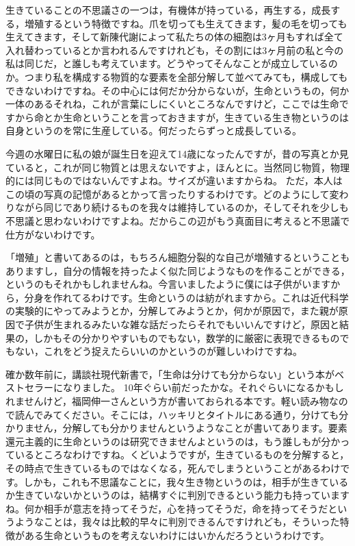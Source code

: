 \documentclass{ltjsbook}
\begin{document}
生きていることの不思議さの一つは，有機体が持っている，再生する，成長する，増殖するという特徴ですね。爪を切っても生えてきます，髪の毛を切っても生えてきます，そして新陳代謝によって私たちの体の細胞は3ヶ月もすれば全て入れ替わっているとか言われるんですけれども，その割には3ヶ月前の私と今の私は同じだ，と誰しも考えています。どうやってそんなことが成立しているのか。つまり私を構成する物質的な要素を全部分解して並べてみても，構成してもできないわけですね。その中心には何だか分からないが，生命というもの，何か一体のあるそれね，これが言葉にしにくいところなんですけど，ここでは生命ですから命とか生命ということを言っておきますが，生きている生き物というのは自身というのを常に生産している。何だったらずっと成長している。

今週の水曜日に私の娘が誕生日を迎えて14歳になったんですが，昔の写真とか見ていると，これが同じ物質とは思えないですよ，ほんとに。当然同じ物質，物理的には同じものではないんですよね。サイズが違いますからね。
ただ，本人はこの頃の写真の記憶があるとかって言ったりするわけです。どのようにして変わりながら同じであり続けるものを我々は維持しているのか，そしてそれを少しも不思議と思わないわけですよね。だからこの辺がもう真面目に考えると不思議で仕方がないわけです。

「増殖」と書いてあるのは，もちろん細胞分裂的な自己が増殖するということもありますし，自分の情報を持ったよく似た同じようなものを作ることができる，というのもそれかもしれませんね。今言いましたように僕には子供がいますから，分身を作れてるわけです。生命というのは紡がれますから。これは近代科学の実験的にやってみようとか，分解してみようとか，何かが原因で，また親が原因で子供が生まれるみたいな雑な話だったらそれでもいいんですけど，原因と結果の，しかもその分かりやすいものでもない，数学的に厳密に表現できるものでもない，これをどう捉えたらいいのかというのが難しいわけですね。

確か数年前に，講談社現代新書で，「生命は分けても分からない」という本がベストセラーになりました\parencite{FukuokaShin1}。
10年ぐらい前だったかな。それぐらいになるかもしれませんけど，福岡伸一さんという方が書いておられる本です。軽い読み物なので読んでみてください。そこには，ハッキリとタイトルにある通り，分けても分かりません，分解しても分かりませんというようなことが書いてあります。要素還元主義的に生命というのは研究できませんよというのは，もう誰しもが分かっているところなわけですね。くどいようですが，生きているものを分解すると，その時点で生きているものではなくなる，死んでしまうということがあるわけです。しかも，これも不思議なことに，我々生き物というのは，相手が生きているか生きていないかというのは，結構すぐに判別できるという能力も持っていますね。何か相手が意志を持ってそうだ，心を持ってそうだ，命を持ってそうだというようなことは，我々は比較的早々に判別できるんですけれども，そういった特徴がある生命というものを考えないわけにはいかんだろうというわけです。
\end{document}
